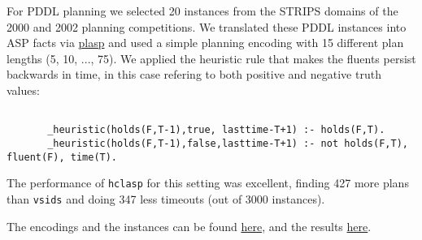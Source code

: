  For PDDL planning we selected 20 instances from the STRIPS domains of the 2000 and 2002 planning competitions. We translated these PDDL instances into ASP facts via \href{http://potassco.sourceforge.net/labs.html}{plasp} and used a simple planning encoding with 15 different plan lengths (5, 10, ..., 75). We applied the heuristic rule that makes the fluents persist backwards in time, in this case refering to both positive and negative truth values: 
\begin{verbatim}

       _heuristic(holds(F,T-1),true, lasttime-T+1) :- holds(F,T).
       _heuristic(holds(F,T-1),false,lasttime-T+1) :- not holds(F,T), fluent(F), time(T).
\end{verbatim}

 The performance of \texttt{hclasp} for this setting was excellent,  finding 427 more plans than \texttt{vsids} and doing 347 less timeouts (out of 3000 instances). 

The encodings and the instances can be found \href{benchmarks/pddl_benchmarks/pddl-benchmarks.zip}{here},  and the results \href{benchmarks/pddl_benchmarks/pddl-results.zip}{here}.


\fi
